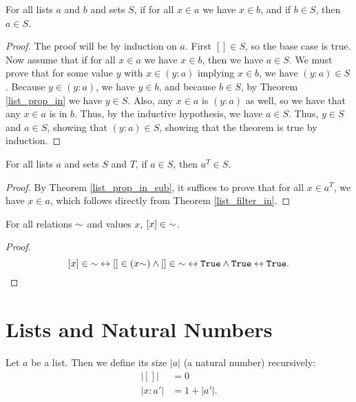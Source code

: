\documentclass[../math.tex]{subfiles}
\begin{document}
\begin{theorem} \label{list_prop_in_sub}
    For all lists $a$ and $b$ and sets $S$, if for all $x \in a$ we have $x \in
    b$, and if $b \in S$, then $a \in S$.
\end{theorem}
\begin{proof}
    The proof will be by induction on $a$.  First $[] \in S$, so the base case
    is true.  Now assume that if for all $x \in a$ we have $x \in b$, then we
    have $a \in S$.  We must prove that for some value $y$ with $x \in (y : a)$
    implying $x \in b$, we have $(y : a) \in S$.  Because $y \in (y : a)$, we
    have $y \in b$, and because $b \in S$, by Theorem \ref{list_prop_in} we have
    $y \in S$.  Also, any $x \in a$ is $(y : a)$ as well, so we have that any $x
    \in a$ is in $b$.  Thus, by the inductive hypothesis, we have $a \in S$.
    Thus, $y \in S$ and $a \in S$, showing that $(y : a) \in S$, showing that
    the theorem is true by induction.
\end{proof}

\begin{theorem} \label{list_prop_other_filter}
    For all lists $a$ and sets $S$ and $T$, if $a \in S$, then $a^T \in S$.
\end{theorem}
\begin{proof}
    By Theorem \ref{list_prop_in_sub}, it suffices to prove that for all $x \in
    a^T$, we have $x \in a$, which follows directly from Theorem
    \ref{list_filter_in}.
\end{proof}

\begin{theorem} \label{list_prop2_single}
    For all relations ${\sim}$ and values $x$, $[x] \in {\sim}$.
\end{theorem}
\begin{proof}
    \[
        [x] \in \usim
        \leftrightarrow [] \in (x\usim) \wedge [] \in \usim
        \leftrightarrow \vtt{True} \wedge \vtt{True}
        \leftrightarrow \vtt{True}.
    \]
\end{proof}

\section{Lists and Natural Numbers}

\begin{definition}
    Let $a$ be a list.  Then we define its size $|a|$ (a natural number)
    recursively:
    \begin{align*}
            |[]| &= 0 \\
        |x : a'| &= 1 + |a'|.
    \end{align*}
\end{definition}
\end{document}

